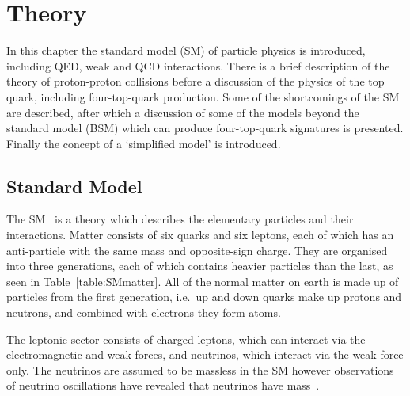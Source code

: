 \chapter{Theory}
\label{c:theory}
\vspace{0.6cm}
In this chapter the standard model (SM) of particle physics is introduced, including QED, weak and QCD interactions. There is a brief description of the theory of proton-proton collisions before a discussion of the physics of the top quark, including four-top-quark production. Some of the shortcomings of the SM are described, after which a discussion of some of the models beyond the standard model (BSM) which can produce four-top-quark signatures is presented. Finally the concept of a `simplified model' is introduced.

\section{Standard Model}

The SM~\cite{Glashow:1961tr,PhysRevLett.19.1264,Salam:1968rm,DGriff} is a theory which describes the elementary particles and their interactions. Matter consists of six quarks and six leptons, each of which has an anti-particle with the same mass and opposite-sign charge. They are organised into three generations, each of which contains heavier particles than the last, as seen in Table~\ref{table:SMmatter}. All of the normal matter on earth is made up of particles from the first generation, i.e.~up and down quarks make up protons and neutrons, and combined with electrons they form atoms. 

The leptonic sector consists of charged leptons, which can interact via the electromagnetic and weak forces, and neutrinos, which interact via the weak force only. The neutrinos are assumed to be massless in the SM however observations of neutrino oscillations have revealed that neutrinos have mass~\cite{PhysRevC.88.025501}.

